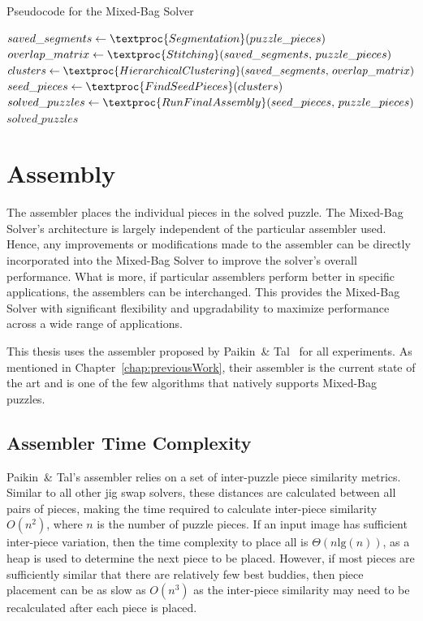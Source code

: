 \begin{algorithm}[tb]
\caption{Pseudocode for the Mixed-Bag Solver}\label{alg:mixedBagSolver}
\begin{algorithmic}[1]
    \State $saved\_segments \gets \textproc{Segmentation}\text{(} puzzle\_pieces \text{)}$
	\State $overlap\_matrix \gets \textproc{Stitching}\text{(} saved\_segments \text{, } puzzle\_pieces \text{)}$
	\State $clusters \gets \textproc{HierarchicalClustering} \text{(}saved\_segments \text{, } overlap\_matrix \text{)}$
	\State $seed\_pieces \gets \textproc{FindSeedPieces} \text{(} clusters \text{)}$
	\State $solved\_puzzles \gets \textproc{RunFinalAssembly} \text{(} seed\_pieces \text{, } puzzle\_pieces \text{)}$
    \State \Return $solved\_puzzles$
\EndFunction
\end{algorithmic}
\end{algorithm}

\section{Assembly}\label{sec:SolverAssembler}

The assembler places the individual pieces in the solved puzzle.  The Mixed-Bag Solver's architecture is largely independent of the particular assembler used.  Hence, any improvements or modifications made to the assembler can be directly incorporated into the Mixed-Bag Solver to improve the solver's overall performance.  What is more, if particular assemblers perform better in specific applications, the assemblers can be interchanged.  This provides the Mixed-Bag Solver with significant flexibility and upgradability to maximize performance across a wide range of applications.

This thesis uses the assembler proposed by Paikin~\& Tal~\cite{paikin2015} for all experiments.  As mentioned in Chapter~\ref{chap:previousWork}, their assembler is the current state of the art and is one of the few algorithms that natively supports Mixed-Bag puzzles.

\subsection{Assembler Time Complexity}\label{sec:assemblerTimeComplexity}

Paikin~\& Tal's assembler relies on a set of inter-puzzle piece similarity metrics.  Similar to all other jig swap solvers, these distances are calculated between all pairs of pieces, making the time required to calculate inter-piece similarity $O(n^2)$, where $n$ is the number of puzzle pieces.  If an input image has sufficient inter-piece variation, then the time complexity to place all is $\Theta(n \text{lg}(n))$, as a heap is used to determine the next piece to be placed.  However, if most pieces are sufficiently similar that there are relatively few best buddies, then piece placement can be as slow as $O(n^3)$ as the inter-piece similarity may need to be recalculated after each piece is placed.

